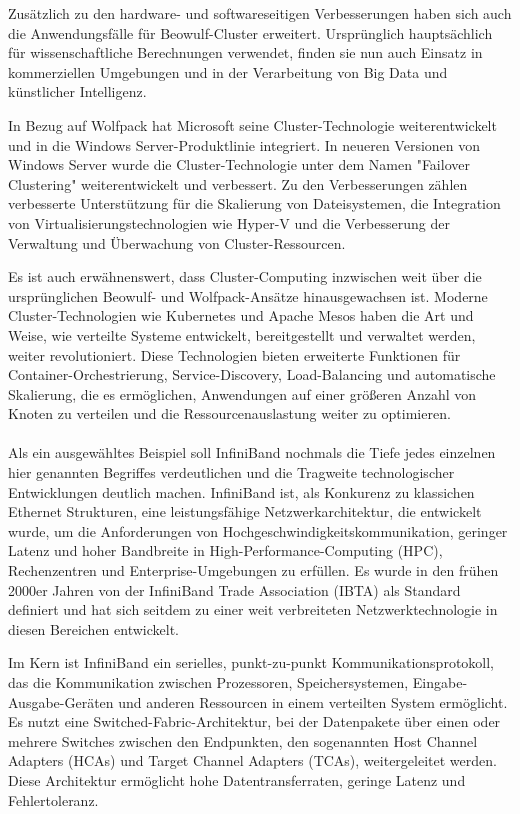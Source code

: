 Zusätzlich zu den hardware- und softwareseitigen Verbesserungen haben sich auch die Anwendungsfälle für Beowulf-Cluster erweitert. Ursprünglich hauptsächlich für wissenschaftliche Berechnungen verwendet, finden sie nun auch Einsatz in kommerziellen Umgebungen und in der Verarbeitung von Big Data und künstlicher Intelligenz.

In Bezug auf Wolfpack hat Microsoft seine Cluster-Technologie weiterentwickelt und in die Windows Server-Produktlinie integriert. In neueren Versionen von Windows Server wurde die Cluster-Technologie unter dem Namen "Failover Clustering" weiterentwickelt und verbessert. Zu den Verbesserungen zählen verbesserte Unterstützung für die Skalierung von Dateisystemen, die Integration von Virtualisierungstechnologien wie Hyper-V und die Verbesserung der Verwaltung und Überwachung von Cluster-Ressourcen.

Es ist auch erwähnenswert, dass Cluster-Computing inzwischen weit über die ursprünglichen Beowulf- und Wolfpack-Ansätze hinausgewachsen ist. Moderne Cluster-Technologien wie Kubernetes und Apache Mesos haben die Art und Weise, wie verteilte Systeme entwickelt, bereitgestellt und verwaltet werden, weiter revolutioniert. Diese Technologien bieten erweiterte Funktionen für Container-Orchestrierung, Service-Discovery, Load-Balancing und automatische Skalierung, die es ermöglichen, Anwendungen auf einer größeren Anzahl von Knoten zu verteilen und die Ressourcenauslastung weiter zu optimieren.
\\\\
Als ein ausgewähltes Beispiel soll InfiniBand nochmals die Tiefe jedes einzelnen hier genannten Begriffes verdeutlichen und die Tragweite technologischer Entwicklungen deutlich machen. InfiniBand ist, als Konkurenz zu klassichen Ethernet Strukturen, eine leistungsfähige Netzwerkarchitektur, die entwickelt wurde, um die Anforderungen von Hochgeschwindigkeitskommunikation, geringer Latenz und hoher Bandbreite in High-Performance-Computing (HPC), Rechenzentren und Enterprise-Umgebungen zu erfüllen. Es wurde in den frühen 2000er Jahren von der InfiniBand Trade Association (IBTA) als Standard definiert und hat sich seitdem zu einer weit verbreiteten Netzwerktechnologie in diesen Bereichen entwickelt.

Im Kern ist InfiniBand ein serielles, punkt-zu-punkt Kommunikationsprotokoll, das die Kommunikation zwischen Prozessoren, Speichersystemen, Eingabe-Ausgabe-Geräten und anderen Ressourcen in einem verteilten System ermöglicht. Es nutzt eine Switched-Fabric-Architektur, bei der Datenpakete über einen oder mehrere Switches zwischen den Endpunkten, den sogenannten Host Channel Adapters (HCAs) und Target Channel Adapters (TCAs), weitergeleitet werden. Diese Architektur ermöglicht hohe Datentransferraten, geringe Latenz und Fehlertoleranz.

